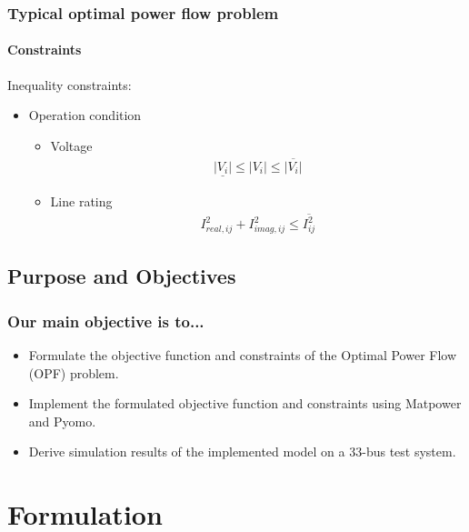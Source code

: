 \documentclass[
	11pt, %
	aspectratio=169, %
]{beamer}
\begin{document}
\begin{frame}
	\frametitle{Typical optimal power flow problem}
	\framesubtitle{Constraints} %
	
	Inequality constraints:
	\begin{itemize}
	\item Operation condition
		\begin{itemize}
			\item Voltage
				\begin{align*}
					\underline{\left| V_{i} \right|} \leq \left| V_{i} \right| \leq \overline{\left| V_{i} \right|}
				\end{align*}

			\item Line rating
				\begin{align*}
					I^{2}_{real,ij}+I^{2}_{imag,ij} \leq \overline{I^{2}_{ij}}
				\end{align*}
		\end{itemize}

	\end{itemize}
	
	
\end{frame}


\subsection{Purpose and Objectives}

\begin{frame}
	\frametitle{Our main objective is to...}
	
	\begin{itemize}
		\item Formulate the objective function and constraints of the Optimal Power Flow (OPF) problem.
		\item Implement the formulated objective function and constraints using Matpower and Pyomo.
		\item Derive simulation results of the implemented model on a 33-bus test system.
	\end{itemize}
	
	
\end{frame}

\section{Formulation}
\end{document}

